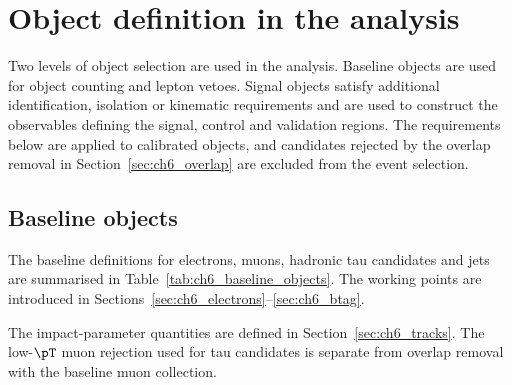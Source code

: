 \section{Object definition in the analysis}
\label{sec:ch6_object_definition}

Two levels of object selection are used in the analysis.
Baseline objects are used for object counting and lepton vetoes.
Signal objects satisfy additional identification, isolation or kinematic requirements and are used to construct the observables defining the signal, control and validation regions.
The requirements below are applied to calibrated objects, and candidates rejected by the overlap removal in Section~\ref{sec:ch6_overlap} are excluded from the event selection.

\subsection{Baseline objects}

The baseline definitions for electrons, muons, hadronic tau candidates and jets are summarised in Table~\ref{tab:ch6_baseline_objects}.
The working points are introduced in Sections~\ref{sec:ch6_electrons}--\ref{sec:ch6_btag}.

The impact-parameter quantities are defined in Section~\ref{sec:ch6_tracks}.
The low-$\pT$ muon rejection used for tau candidates is separate from overlap removal with the baseline muon collection.

